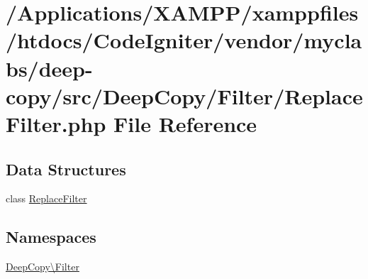 \hypertarget{_filter_2_replace_filter_8php}{}\section{/\+Applications/\+X\+A\+M\+P\+P/xamppfiles/htdocs/\+Code\+Igniter/vendor/myclabs/deep-\/copy/src/\+Deep\+Copy/\+Filter/\+Replace\+Filter.php File Reference}
\label{_filter_2_replace_filter_8php}
\subsection*{Data Structures}
\begin{DoxyCompactItemize}
\item 
class \mbox{\hyperlink{class_deep_copy_1_1_filter_1_1_replace_filter}{Replace\+Filter}}
\end{DoxyCompactItemize}
\subsection*{Namespaces}
\begin{DoxyCompactItemize}
\item 
 \mbox{\hyperlink{namespace_deep_copy_1_1_filter}{Deep\+Copy\textbackslash{}\+Filter}}
\end{DoxyCompactItemize}
